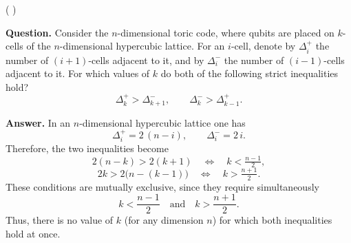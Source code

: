 \documentclass[manuscript,screen,review]{acmart}
\begin{document}

(  )



\textbf{Question.}  
Consider the $n$-dimensional toric code, where qubits are placed on $k$-cells of the $n$-dimensional hypercubic lattice.  
For an $i$-cell, denote by $\Delta_i^{+}$ the number of $(i{+}1)$-cells adjacent to it, and by $\Delta_i^{-}$ the number of $(i{-}1)$-cells adjacent to it.  
For which values of $k$ do both of the following strict inequalities hold?
\[
\Delta_k^{+} > \Delta_{k+1}^{-}, \qquad \Delta_k^{-} > \Delta_{k-1}^{+}.
\]

\textbf{Answer.}  
In an $n$-dimensional hypercubic lattice one has
\[
\Delta_i^{+} = 2\,(n-i), \qquad \Delta_i^{-} = 2\,i.
\]
Therefore, the two inequalities become
\[
2(n-k) > 2(k+1) \quad\iff\quad k < \tfrac{n-1}{2},
\]
\[
2k > 2\bigl(n-(k-1)\bigr) \quad\iff\quad k > \tfrac{n+1}{2}.
\]
These conditions are mutually exclusive, since they require simultaneously
\[
k < \frac{n-1}{2} \quad \text{and} \quad k > \frac{n+1}{2}.
\]
Thus, there is no value of $k$ (for any dimension $n$) for which both inequalities hold at once.  
\end{document}
